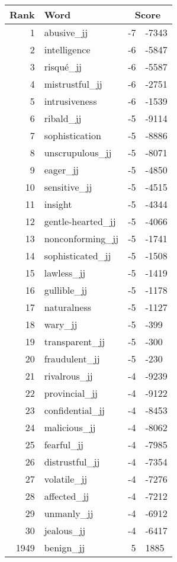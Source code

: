 \begin{longtable}[!htbp]{| rlr@{.}l |}
    \hline
    \textbf{Rank} & \textbf{Word} & \multicolumn{2}{c|}{\textbf{Score}} \\
    \hline
    \endhead
    1 & abusive\_jj & -7 & -7343 \\
    2 & intelligence & -6 & -5847 \\
    3 & risqué\_jj & -6 & -5587 \\
    4 & mistrustful\_jj & -6 & -2751 \\
    5 & intrusiveness & -6 & -1539 \\
    6 & ribald\_jj & -5 & -9114 \\
    7 & sophistication & -5 & -8886 \\
    8 & unscrupulous\_jj & -5 & -8071 \\
    9 & eager\_jj & -5 & -4850 \\
    10 & sensitive\_jj & -5 & -4515 \\
    11 & insight & -5 & -4344 \\
    12 & gentle-hearted\_jj & -5 & -4066 \\
    13 & nonconforming\_jj & -5 & -1741 \\
    14 & sophisticated\_jj & -5 & -1508 \\
    15 & lawless\_jj & -5 & -1419 \\
    16 & gullible\_jj & -5 & -1178 \\
    17 & naturalness & -5 & -1127 \\
    18 & wary\_jj & -5 & -399 \\
    19 & transparent\_jj & -5 & -300 \\
    20 & fraudulent\_jj & -5 & -230 \\
    21 & rivalrous\_jj & -4 & -9239 \\
    22 & provincial\_jj & -4 & -9122 \\
    23 & confidential\_jj & -4 & -8453 \\
    24 & malicious\_jj & -4 & -8062 \\
    25 & fearful\_jj & -4 & -7985 \\
    26 & distrustful\_jj & -4 & -7354 \\
    27 & volatile\_jj & -4 & -7276 \\
    28 & affected\_jj & -4 & -7212 \\
    29 & unmanly\_jj & -4 & -6912 \\
    30 & jealous\_jj & -4 & -6417 \\
    1949 & benign\_jj & 5 & 1885 \\

\end{longtable}
